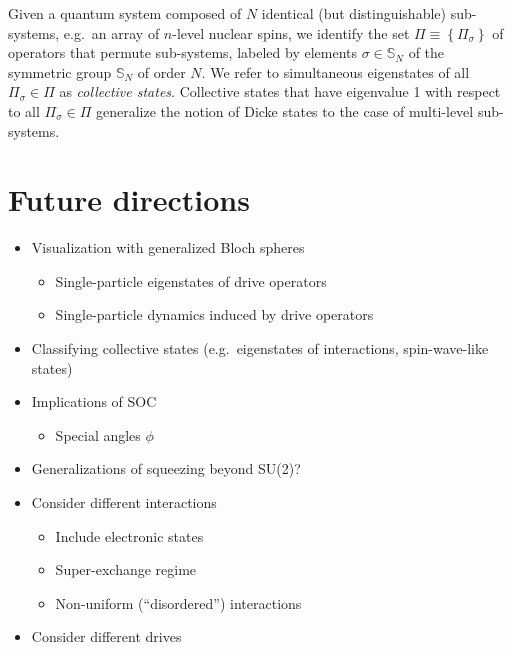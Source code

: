 \documentclass[nofootinbib,notitlepage,11pt]{revtex4-2}
\renewcommand{\set}[1]{\left\{#1\right\}} %
\newcommand{\1}{\mathds{1}}
\renewcommand{\SS}{\mathbb{S}}
\begin{document}
Given a quantum system composed of $N$ identical (but distinguishable)
sub-systems, e.g.~an array of $n$-level nuclear spins, we identify the
set $\Pi\equiv\set{\Pi_\sigma}$ of operators that permute sub-systems,
labeled by elements $\sigma\in\SS_N$ of the symmetric group $\SS_N$ of
order $N$.  We refer to simultaneous eigenstates of all
$\Pi_\sigma\in\Pi$ as {\it collective states}.  Collective states that
have eigenvalue 1 with respect to all $\Pi_\sigma\in\Pi$ generalize
the notion of Dicke states to the case of multi-level sub-systems.



\vspace{3cm}


\section{Future directions}

\begin{itemize}
\item Visualization with generalized Bloch spheres
  \begin{itemize}
  \item Single-particle eigenstates of drive operators
  \item Single-particle dynamics induced by drive operators
  \end{itemize}
\item Classifying collective states (e.g.~eigenstates of interactions,
  spin-wave-like states)
\item Implications of SOC
  \begin{itemize}
  \item Special angles $\phi$
  \end{itemize}
\item Generalizations of squeezing beyond SU(2)?
\item Consider different interactions
  \begin{itemize}
  \item Include electronic states
  \item Super-exchange regime
  \item Non-uniform (``disordered'') interactions
  \end{itemize}
\item Consider different drives
\end{itemize}

\appendix

\end{document}
